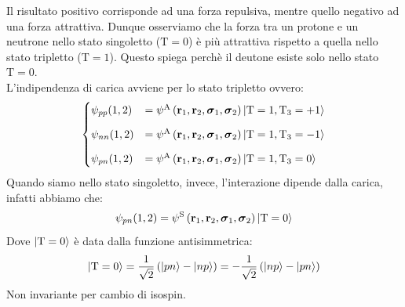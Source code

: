 Il risultato positivo corrisponde ad una forza repulsiva, mentre quello negativo ad una forza attrattiva. Dunque osserviamo che la forza tra un protone e un neutrone nello stato singoletto ($\text{T}=0$) è più attrattiva rispetto a quella nello stato tripletto ($\text{T}=1$). Questo spiega perchè il deutone esiste solo nello stato $\text{T}=0$.\\
L'indipendenza di carica avviene per lo stato tripletto ovvero:
\begin{equation}
  \begin{cases}
    \psi_{pp}(1,2) &= \psi^{\text{A}}\left(\vb{r}_1, \vb{r}_2,\boldsymbol{\sigma}_1,\boldsymbol{\sigma}_2\right)\ket{\text{T}=1,\text{T}_3=+1} \\[8pt]
    \psi_{nn}(1,2) &= \psi^{\text{A}}\left(\vb{r}_1, \vb{r}_2,\boldsymbol{\sigma}_1,\boldsymbol{\sigma}_2\right)\ket{\text{T}=1,\text{T}_3=-1} \\[8pt]
    \psi_{pn}(1,2) &= \psi^{\text{A}}\left(\vb{r}_1, \vb{r}_2,\boldsymbol{\sigma}_1,\boldsymbol{\sigma}_2\right)\ket{\text{T}=1,\text{T}_3=0}
  \end{cases}
\end{equation}
Quando siamo nello stato singoletto, invece, l'interazione dipende dalla carica, infatti abbiamo che:
\begin{equation}
  \psi_{pn}(1,2) = \psi^{\text{S}}\left(\vb{r}_1, \vb{r}_2,\boldsymbol{\sigma}_1,\boldsymbol{\sigma}_2\right)\ket{\text{T}=0}
\end{equation}
Dove $\ket{\text{T}=0}$ è data dalla funzione antisimmetrica:
\begin{equation}
  \ket{\text{T}=0} = \dfrac{1}{\sqrt{2}}\left(\ket{pn} - \ket{np}\right) = - \dfrac{1}{\sqrt{2}}\left(\ket{np} - \ket{pn}\right)
\end{equation}
Non invariante per cambio di isospin.
